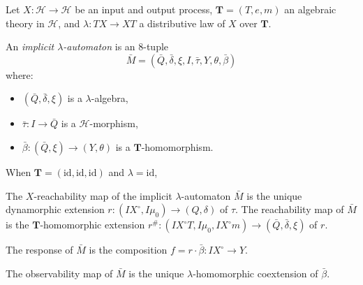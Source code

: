 Let $X: \mathcal{H} \longrightarrow \mathcal{H}$ be an input and output process, $\mathbf{T} = (T, e, m)$ an algebraic theory in $\mathcal{H}$, and $\lambda: TX \longrightarrow XT$ a distributive law of $X$ over $\mathbf{T}$.

An \textit{implicit $\lambda$-automaton} is an $8$-tuple
$$\bar{M} = (\bar{Q}, \bar{\delta}, \xi, I, \bar{\tau}, Y, \theta, \bar{\beta})$$
where:
\begin{itemize}
\item $(\bar{Q}, \bar{\delta}, \xi)$ is a $\lambda$-algebra,
\item $\bar{\tau}: I \longrightarrow \bar{Q}$ is a $\mathcal{H}$-morphism,
\item $\bar{\beta}: (\bar{Q}, \xi) \longrightarrow (Y, \theta)$ is a $\mathbf{T}$-homomorphism.
\end{itemize}

When $\mathbf{T} = (\mathrm{id}, \mathrm{id}, \mathrm{id})$ and $\lambda = \mathrm{id}$, 

The $X$-reachability map of the implicit $\lambda$-automaton $\bar{M}$ is the unique dynamorphic extension $r: (IX^\circ, I\mu_0) \longrightarrow (Q, \delta)$ of $\tau$. The reachability map of $\bar{M}$ is the $\mathbf{T}$-homomorphic extension $r^{\#}: (IX^\circ T, I\mu_0, IX^\circ m) \longrightarrow (\bar{Q}, \bar{\delta}, \xi)$ of $r$.

The response of $\bar{M}$ is the composition $f = r \cdot \bar{\beta}: IX^\circ \to Y$.

The observability map of $\bar{M}$ is the unique $\lambda$-homomorphic coextension of $\bar{\beta}$.
